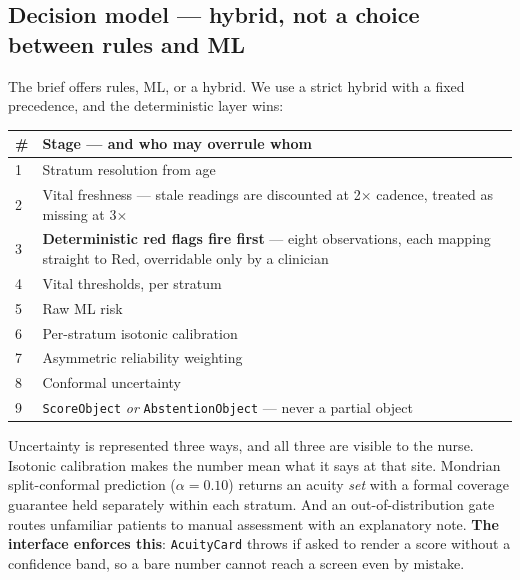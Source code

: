 \documentclass[10pt,a4paper,twocolumn]{article}
\newcommand{\cm}[1]{\texttt{#1}}
\begin{document}
\subsection{Decision model --- hybrid, not a choice between rules and ML}
The brief offers rules, ML, or a hybrid. We use a strict hybrid with a fixed precedence, and the
deterministic layer wins:

\begin{center}\footnotesize\sffamily
\begin{tabular}{@{}p{0.6cm}p{7.2cm}@{}}
\toprule
\rowcolor{AccPurple!10}
\textbf{\#} & \textbf{Stage --- and who may overrule whom}\\
\midrule
1 & Stratum resolution from age\\
2 & Vital freshness --- stale readings are discounted at 2$\times$ cadence, treated as missing at 3$\times$\\
3 & \textbf{Deterministic red flags fire first} --- eight observations, each mapping straight to Red, overridable only by a clinician\\
4 & Vital thresholds, per stratum\\
5 & Raw ML risk\\
6 & Per-stratum isotonic calibration\\
7 & Asymmetric reliability weighting\\
8 & Conformal uncertainty\\
9 & \cm{ScoreObject} \emph{or} \cm{AbstentionObject} --- never a partial object\\
\bottomrule
\end{tabular}
\end{center}

\vspace{3pt}
Uncertainty is represented three ways, and all three are visible to the nurse. Isotonic calibration
makes the number mean what it says at that site. Mondrian split-conformal prediction
($\alpha=0.10$) returns an acuity \emph{set} with a formal coverage guarantee held separately
within each stratum. And an out-of-distribution gate routes unfamiliar patients to manual
assessment with an explanatory note. \textbf{The interface enforces this}: \cm{AcuityCard} throws
if asked to render a score without a confidence band, so a bare number cannot reach a screen even
by mistake.
\end{document}
